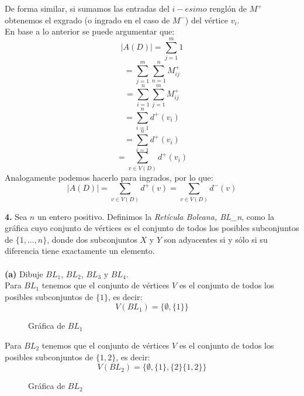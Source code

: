 \documentclass[12pt]{article}
\begin{document}
De forma similar, si sumamos las entradas del $i-esimo$ renglón de $M^+$ obtenemos el exgrado (o ingrado en el caso de $M^-$) del vértice $v_i$.\\

En base a lo anterior se puede argumentar que:
\[\mid A(D) \mid = \sum\limits_{j = 1}^{m} 1\]
\[= \sum\limits_{j = 1}^{m} \sum\limits_{n = 1}^{n} M^+_{ij}\]
\[= \sum\limits_{i = 1}^{n} \sum\limits_{j = 1}^{m} M^+_{ij}\]
\[= \sum\limits_{i = 1}^{n} d^+(v_i)\]
\[= \sum\limits_{i = 1}^{n} d^+(v_i)\]
\[= \sum_{\displaystyle v \in V(D)} d^+(v_i)\] 
Analogamente podemos hacerlo para ingrados, por lo que:
\[\mid A(D) \mid = \sum_{\displaystyle v \in V(D)} d^+(v) = \sum_{\displaystyle v \in V(D)} d^-(v)\]



\vspace{1cm}
%
%
\textbf{4.} Sea $n$ un entero positivo. Definimos la \textit{Retícula Boleana, BL\_n}, como
la gráfica cuyo conjunto de vértices es el conjunto de todos los posibles subconjuntos
de $\{1, ..., n\}$, donde dos subconjuntos $X$ y $Y$ son adyacentes si y sólo si su diferencia
tiene exactamente un elemento.\\
\\
\textbf{(a)} Dibuje $BL_1$, $BL_2$, $BL_3$ y $BL_4$.
\\

Para $BL_1$ tenemos que el conjunto de vértices $V$ es el conjunto de todos los posibles subconjuntos de $\{1\}$, es decir:
\[V(BL_1) = \{\emptyset, \{1\}\}\]

\begin{figure}[h!]
    \centering
    \begin{minipage}{0.4\textwidth}
        \centering
        \caption{Gráfica de $BL_1$}
    \end{minipage}
\end{figure}

Para $BL_2$ tenemos que el conjunto de vértices $V$ es el conjunto de todos los posibles subconjuntos de $\{1, 2\}$, es decir:
\[V(BL_2) = \{\emptyset, \{1\}, \{2\} \{1, 2\}\}\]

\begin{figure}[h!]
    \centering
    \begin{minipage}{0.4\textwidth}
        \centering
        \caption{Gráfica de $BL_2$}
    \end{minipage}
\end{figure}
\end{document}
